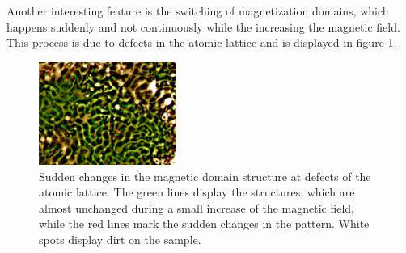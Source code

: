 \documentclass[a4paper]{scrartcl}
\numberwithin{equation}{section}
\numberwithin{figure}{section}
\numberwithin{table}{section}
\begin{document}
Another interesting feature is the switching of magnetization domains, which happens suddenly and not continuously while the increasing the magnetic field. This process is due to defects in the atomic lattice and is displayed in figure \ref{fig:defect}.
\begin{figure}
    \includegraphics[width=0.4\textwidth]{img/kontrast.pdf}
  \caption{ \small Sudden changes in the magnetic domain structure at defects of the atomic lattice. The green lines display the structures, which are almost unchanged during a small increase of the magnetic field, while the red lines mark the sudden changes in the pattern. White spots display dirt on the sample. }
  	\label{fig:defect}
\end{figure}





 

\end{document}
